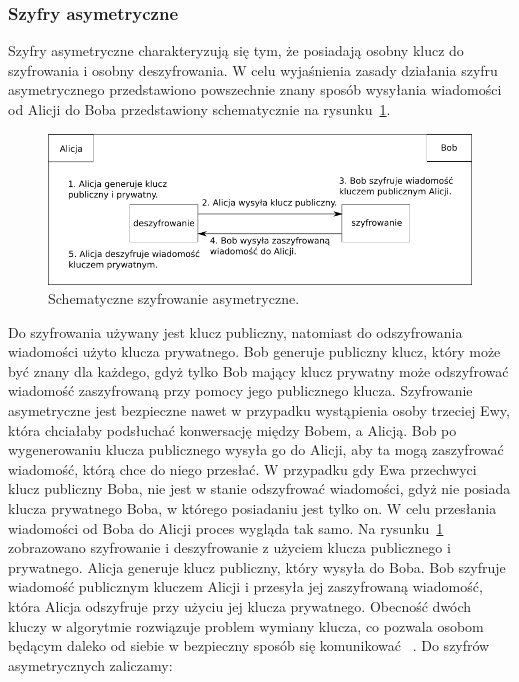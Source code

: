 \documentclass[12p]{article}
\begin{document}
\subsubsection{Szyfry asymetryczne}

\quad Szyfry asymetryczne charakteryzują się tym, że posiadają osobny klucz do szyfrowania i osobny deszyfrowania. W celu wyjaśnienia zasady działania szyfru asymetrycznego przedstawiono powszechnie znany sposób wysyłania wiadomości od Alicji do Boba przedstawiony schematycznie na rysunku~\ref{rsa}.

\begin{figure}[H]
\centering
\includegraphics[width=15cm]{rsa.png}
\caption{Schematyczne szyfrowanie asymetryczne.}\label{rsa}
\end{figure}
\newpage
Do szyfrowania używany jest klucz publiczny, natomiast do odszyfrowania wiadomości użyto klucza prywatnego. Bob generuje publiczny klucz, który może być znany dla każdego, gdyż tylko Bob mający klucz prywatny może odszyfrować wiadomość zaszyfrowaną przy pomocy jego publicznego klucza. Szyfrowanie asymetryczne jest bezpieczne nawet w przypadku wystąpienia osoby trzeciej Ewy, która chciałaby podsłuchać konwersację między Bobem, a Alicją. Bob po wygenerowaniu klucza publicznego wysyła go do Alicji, aby ta mogą zaszyfrować wiadomość, którą chce do niego przesłać. W przypadku gdy Ewa przechwyci klucz publiczny Boba, nie jest w stanie odszyfrować wiadomości, gdyż nie posiada klucza prywatnego Boba, w którego posiadaniu jest tylko on. W celu przesłania wiadomości od Boba do Alicji proces wygląda tak samo. Na rysunku~\ref{rsa} zobrazowano szyfrowanie i deszyfrowanie z użyciem klucza publicznego i prywatnego. Alicja generuje klucz publiczny, który wysyła do Boba. Bob szyfruje wiadomość publicznym kluczem Alicji i przesyła jej zaszyfrowaną wiadomość, która Alicja odszyfruje przy użyciu jej klucza prywatnego. Obecność dwóch kluczy w algorytmie rozwiązuje problem wymiany klucza, co pozwala osobom będącym daleko od siebie w bezpieczny sposób się komunikować ~\cite{asymetric}. Do szyfrów asymetrycznych zaliczamy:
\end{document}
